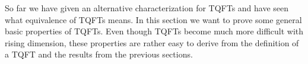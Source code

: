 So far we have given an alternative characterization for TQFTs and have seen what equivalence of TQFTs means. In this section we want to prove some general basic properties of TQFTs. Even though TQFTs become much more difficult with rising dimension, these properties are rather easy to derive from the definition of a TQFT and the results from the previous sections.
